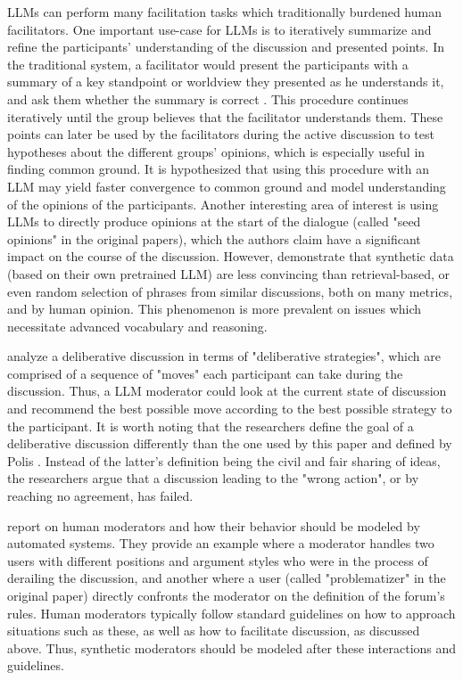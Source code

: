 LLMs can perform many facilitation tasks which traditionally burdened human facilitators. One important use-case for LLMs is to iteratively summarize and refine the participants' understanding of the discussion and presented points. In the traditional system, a facilitator would present the participants with a summary of a key standpoint or worldview they presented as he understands it, and ask them whether the summary is correct \cite{small-polis-llm, Tsai2024Generative}. This procedure continues iteratively until the group believes that the facilitator understands them. These points can later be used by the facilitators during the active discussion to test hypotheses about the different groups' opinions, which is especially useful in finding common ground. It is hypothesized that using this procedure with an LLM may yield faster convergence to common ground and model understanding of the opinions of the participants. Another interesting area of interest is using LLMs to directly produce opinions \cite{small-polis-llm} at the start of the dialogue (called "seed opinions" in the original papers), which the authors claim have a significant impact on the course of the discussion. However, \citet{karadzhov2023delidata} demonstrate that synthetic data (based on their own pretrained LLM) are less convincing than retrieval-based, or even random selection of phrases from similar discussions, both on many metrics, and by human opinion. This phenomenon is more prevalent on issues which necessitate advanced vocabulary and reasoning.

\citet{al-khatib-etal-2018-modeling} analyze a deliberative discussion in terms of "deliberative strategies", which are comprised of a sequence of "moves" each participant can take during the discussion. Thus, a LLM moderator could look at the current state of discussion and recommend the best possible move according to the best possible strategy to the participant. It is worth noting that the researchers define the goal of a deliberative discussion differently than the one used by this paper and defined by Polis \cite{small-polis-llm}. Instead of the latter's definition being the civil and fair sharing of ideas, the researchers argue that a discussion leading to the "wrong action", or by reaching no agreement, has failed.

\citet{vecchi-2021-towards} report on human moderators and how their behavior should be modeled by automated systems. They provide an example where a moderator handles two users with different positions and argument styles who were in the process of derailing the discussion, and another where a user (called "problematizer" in the original paper) directly confronts the moderator on the definition of the forum's rules. Human moderators typically follow standard guidelines on how to approach situations such as these, as well as how to facilitate discussion, as discussed above. Thus, synthetic moderators should be modeled after these interactions and guidelines.

